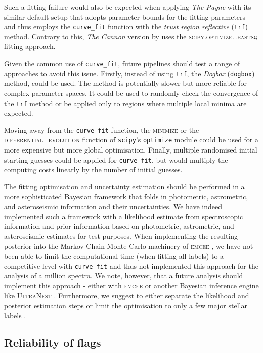 \documentclass[
  journal=pasa,
  manuscript=research-paper, %
  year=2024,
  volume=37
]{cup-journal}
\begin{document}
Such a fitting failure would also be expected when applying \textit{The Payne} \citep{Ting2019} with its similar default setup that adopts parameter bounds for the fitting parameters and thus employs the \texttt{curve\_fit} function with the \textit{trust region reflective} (\texttt{trf}) method. Contrary to this, \textit{The Cannon} version by \citet{Casey2016} uses the \textsc{scipy.optimize.leastsq} fitting approach.

Given the common use of \texttt{curve\_fit}, future pipelines should test a range of approaches to avoid this issue. Firstly, instead of using \texttt{trf}, the \textit{Dogbox} (\texttt{dogbox}) method,  could be used. The method is potentially slower but more reliable for complex parameter spaces. It could be used to randomly check the convergence of the \texttt{trf} method or be applied only to regions where multiple local minima are expected.

Moving away from the \texttt{curve\_fit} function, the \textsc{minimize} or the \textsc{differential\_evolution} function of \texttt{scipy}'s \texttt{optimize} module could be used for a more expensive but more global optimisation. Finally, multiple randomised initial starting guesses could be applied for \texttt{curve\_fit}, but would multiply the computing costs linearly by the number of initial guesses.

The fitting optimisation and uncertainty estimation should be performed in a more sophisticated Bayesian framework that folds in photometric, astrometric, and asteroseismic information and their uncertainties. We have indeed implemented such a framework with a likelihood estimate from spectroscopic information and prior information based on photometric, astrometric, and asteroseismic estimates for test purposes. When implementing the resulting posterior into the Markov-Chain Monte-Carlo machinery of \textsc{emcee} \citep{ForemanMackey2013}, we have not been able to limit the computational time (when fitting all labels) to a competitive level with \texttt{curve\_fit} and thus not implemented this approach for the analysis of a million spectra. We note, however, that a future analysis should implement this approach - either with \textsc{emcee} or another Bayesian inference engine like \textsc{UltraNest} \citep{Buchner2021}. Furthermore, we suggest to either separate the likelihood and posterior estimation steps \citep[see e.g.][]{Gent2022} or limit the optimisation to only a few major stellar labels \citep[see e.g.][]{Traven2020}.

\subsection{Reliability of flags} \label{sec:caveats_flags}
\end{document}
